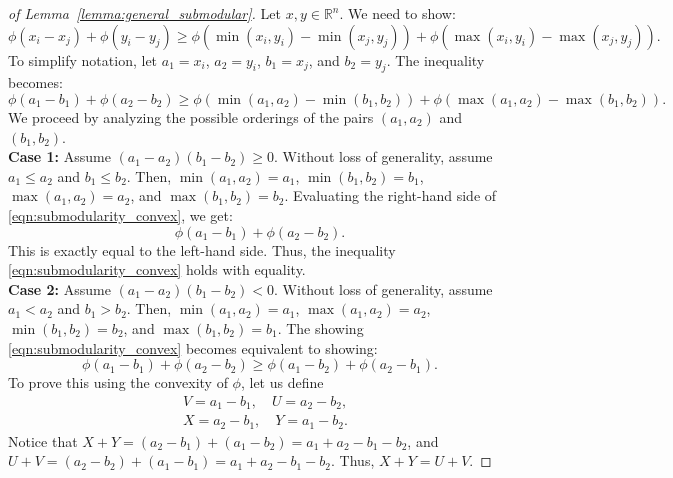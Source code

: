 \documentclass[11pt]{article}
\newcommand{\bR}{\mathbb{R}}
\theoremstyle{plain}
\theoremstyle{definition}
\theoremstyle{remark}
\begin{document}
\begin{appendix}
\begin{proof}[of Lemma~\ref{lemma:general_submodular}]
Let $x, y \in \bR^n$. We need to show:
\begin{equation*}
    \phi(x_i - x_j) + \phi(y_i - y_j) \geq \phi(\min(x_i, y_i) - \min(x_j, y_j)) + \phi(\max(x_i, y_i) - \max(x_j, y_j)).
\end{equation*}
To simplify notation, let $a_1 = x_i$, $a_2 = y_i$, $b_1 = x_j$, and $b_2 = y_j$. The inequality becomes:
\begin{equation}\label{eqn:submodularity_convex}
    \phi(a_1 - b_1) + \phi(a_2 - b_2) \geq \phi(\min(a_1, a_2) - \min(b_1, b_2)) + \phi(\max(a_1, a_2) - \max(b_1, b_2)).
\end{equation}
We proceed by analyzing the possible orderings of the pairs $(a_1, a_2)$ and $(b_1, b_2)$.
\\
\noindent \textbf{Case 1: }
Assume $(a_1 - a_2)(b_1 - b_2) \geq 0$. Without loss of generality, assume $a_1 \leq a_2$ and $b_1 \leq b_2$.
Then, $\min(a_1, a_2) = a_1$, $\min(b_1, b_2) = b_1$, $\max(a_1, a_2) = a_2$, and $\max(b_1, b_2) = b_2$.
Evaluating the right-hand side of \eqref{eqn:submodularity_convex}, we get:
\begin{equation*}
    \phi(a_1 - b_1) + \phi(a_2 - b_2).
\end{equation*}
This is exactly equal to the left-hand side. Thus, the inequality \eqref{eqn:submodularity_convex} holds with equality. 
\\
\noindent 
\textbf{Case 2:}
Assume $(a_1 - a_2)(b_1 - b_2) < 0$. Without loss of generality, assume $a_1 < a_2$ and $b_1 > b_2$. 
Then, $\min(a_1, a_2) = a_1$, $\max(a_1, a_2) = a_2$, $\min(b_1, b_2) = b_2$, and $\max(b_1, b_2) = b_1$.
The showing \eqref{eqn:submodularity_convex} becomes equivalent to showing:
\begin{equation} \label{eq:target_ineq}
    \phi(a_1 - b_1) + \phi(a_2 - b_2) \geq \phi(a_1 - b_2) + \phi(a_2 - b_1).
\end{equation}
To prove this using the convexity of $\phi$, let us define 
\begin{align*}
    &V = a_1 - b_1, \quad
    U = a_2 - b_2, \\
    &X = a_2 - b_1, \quad
    Y = a_1 - b_2.
\end{align*}
Notice that $X + Y = (a_2 - b_1) + (a_1 - b_2) = a_1 + a_2 - b_1 - b_2$, and $U + V = (a_2 - b_2) + (a_1 - b_1) = a_1 + a_2 - b_1 - b_2$. Thus, $X + Y = U + V$.


\end{proof}
\end{appendix}
\end{document}
